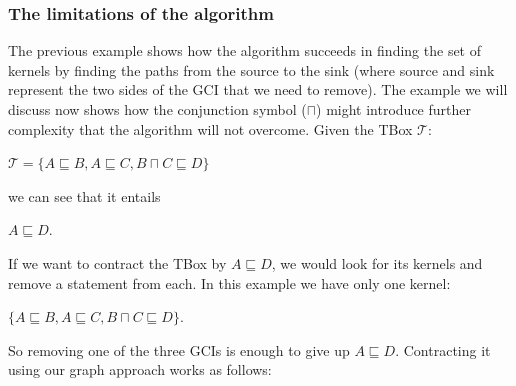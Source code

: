 \subsubsection{The limitations of the algorithm}
The previous example shows how the algorithm succeeds in finding the set of kernels by finding the paths from the source to the sink (where source and sink represent the two sides of the GCI that we need to remove). The example we will discuss now shows how the conjunction symbol ($\sqcap$) might introduce further complexity that the algorithm will not overcome. Given the TBox $\mathcal{T}$:
\begin{center}
$\mathcal{T} = \lbrace A \sqsubseteq B, A \sqsubseteq C, B \sqcap C \sqsubseteq D \rbrace$
\end{center}
we can see that it entails
\begin{center}
$A \sqsubseteq D$.
\end{center}
If we want to contract the TBox by $A \sqsubseteq D$, we would look for its kernels and remove a statement from each. In this example we have only one kernel:
\begin{center}
$\lbrace A \sqsubseteq B, A \sqsubseteq C, B \sqcap C \sqsubseteq D \rbrace$.
\end{center}
So removing one of the three GCIs is enough to give up $A \sqsubseteq D$. Contracting it using our graph approach works as follows:

